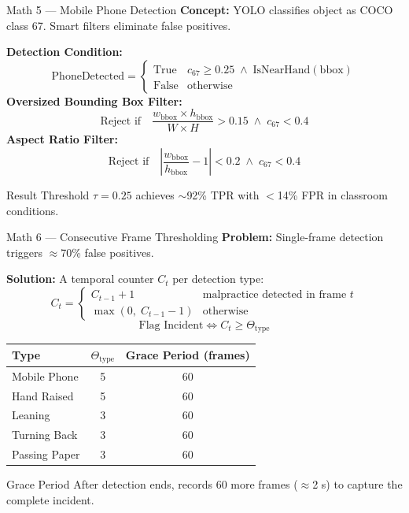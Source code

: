 \documentclass{beamer}
\begin{document}
\begin{frame}{Math 5 --- Mobile Phone Detection}
\textbf{Concept:} YOLO classifies object as COCO class 67. Smart filters eliminate false positives.
\vspace{0.2cm}

\textbf{Detection Condition:}
\[ \text{PhoneDetected} = \begin{cases} \text{True} & c_{67} \geq 0.25 \;\wedge\; \text{IsNearHand}(\text{bbox}) \\ \text{False} & \text{otherwise} \end{cases} \]
\textbf{Oversized Bounding Box Filter:}
\[ \text{Reject if}\quad \frac{w_{\text{bbox}}\times h_{\text{bbox}}}{W\times H} > 0.15 \;\wedge\; c_{67} < 0.4 \]
\textbf{Aspect Ratio Filter:}
\[ \text{Reject if}\quad \left|\frac{w_{\text{bbox}}}{h_{\text{bbox}}} - 1\right| < 0.2 \;\wedge\; c_{67} < 0.4 \]
\begin{alertblock}{Result}
Threshold $\tau = 0.25$ achieves $\sim$92\% TPR with $<$14\% FPR in classroom conditions.
\end{alertblock}
\end{frame}

\begin{frame}{Math 6 --- Consecutive Frame Thresholding}
\textbf{Problem:} Single-frame detection triggers $\approx$70\% false positives.

\textbf{Solution:} A temporal counter $C_t$ per detection type:
\[ C_t = \begin{cases} C_{t-1} + 1 & \text{malpractice detected in frame }t \\ \max(0,\;C_{t-1}-1) & \text{otherwise} \end{cases} \]
\[ \boxed{\text{Flag Incident} \iff C_t \geq \Theta_{\text{type}}} \]
\begin{center}
\footnotesize
\begin{tabular}{lcc}
\toprule
\textbf{Type} & $\Theta_{\text{type}}$ & \textbf{Grace Period (frames)} \\
\midrule
Mobile Phone  & 5 & 60 \\
Hand Raised   & 5 & 60 \\
Leaning       & 3 & 60 \\
Turning Back  & 3 & 60 \\
Passing Paper & 3 & 60 \\
\bottomrule
\end{tabular}
\end{center}
\begin{block}{Grace Period}
After detection ends, records 60 more frames ($\approx$2 s) to capture the complete incident.
\end{block}
\end{frame}
\end{document}
